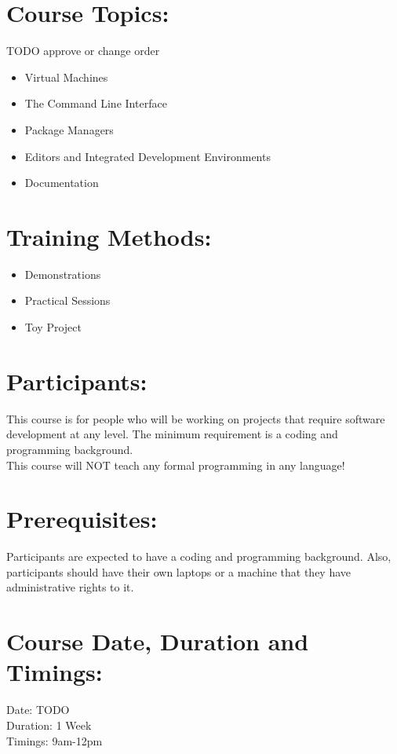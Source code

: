 \documentclass[a4paper,11pt]{article}
\begin{document}
\section{Course Topics:}
TODO approve or change order
\begin{itemize}
	\item Virtual Machines
	\item The Command Line Interface
	\item Package Managers
	\item Editors and Integrated Development Environments
	\item Documentation
\end{itemize}

\section{Training Methods:}
\begin{itemize}
	\item Demonstrations
	\item Practical Sessions
	\item Toy Project
\end{itemize}

\section{Participants:}
This course is for people who will be working on projects that require software development at any level.  The minimum requirement is a coding and programming background.\\
This course will NOT teach any formal programming in any language!

\section{Prerequisites:}
Participants are expected to have a coding and programming background. Also, participants should have their own laptops or a machine that they have administrative rights to it.

\section{Course Date, Duration and Timings:}
Date: TODO\\
Duration: 1 Week\\
Timings: 9am-12pm
\end{document}
